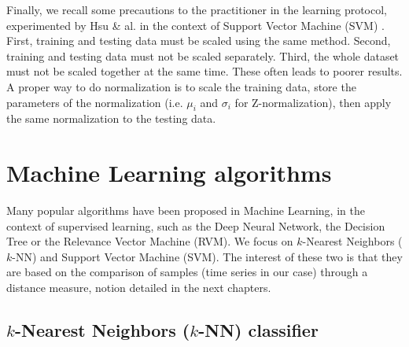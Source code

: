 Finally, we recall some precautions to the practitioner in the learning protocol, experimented by Hsu \& al. in the context of Support Vector Machine (SVM) \cite{Hsu2008}. First, training and testing data must be scaled using the same method. Second, training and testing data must not be scaled separately. Third, the whole dataset must not be scaled together at the same time. These often leads to poorer results. A proper way to do normalization is to scale the training data, store the parameters of the normalization (i.e. $\mu_i$ and $\sigma_i$ for Z-normalization), then apply the same normalization to the testing data. 


\newpage
\section{Machine Learning algorithms}

Many popular algorithms have been proposed in Machine Learning, in the context of supervised learning, such as the Deep Neural Network, the Decision Tree or the Relevance Vector Machine (RVM). We focus on $k$-Nearest Neighbors ($k$-NN) and Support Vector Machine (SVM). The interest of these two is that they are based on the comparison of samples (time series in our case) through a distance measure, notion detailed in the next chapters.  


\subsection{$k$-Nearest Neighbors ($k$-NN) classifier}
\label{sec:kNN}

